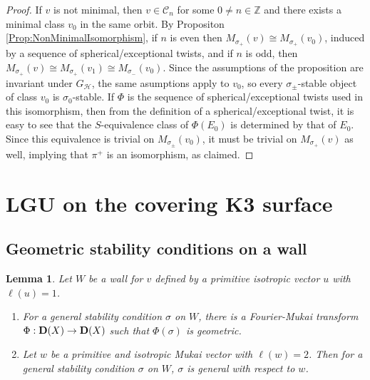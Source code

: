 \documentclass[leqno,11pt]{amsart}
\def\Z{\ensuremath{\mathbb{Z}}}
\newtheorem{Lem}[Thm]{Lemma}
\theoremstyle{definition}
\def\Z{\ensuremath{\mathbb{Z}}}
\def\CC{\ensuremath{\mathcal C}}
\def\HH{\ensuremath{\mathcal H}}
\begin{document}
\begin{proof}
If $v$ is not minimal, then $v\in\CC_n$ for some $0\neq n\in\Z$ and there exists a minimal class $v_0$ in the same orbit.  By Propositon \ref{Prop:NonMinimalIsomorphism}, if $n$ is even then $M_{\sigma_+}(v)\cong M_{\sigma_+}(v_0)$, induced by a sequence of spherical/exceptional twists, and if $n$ is odd, then $M_{\sigma_+}(v)\cong M_{\sigma_+}(v_1)\cong M_{\sigma_-}(v_0)$.  Since the assumptions of the proposition are invariant under $G_{\HH}$, the same asumptions apply to $v_0$, so every $\sigma_\pm$-stable object of class $v_0$ is $\sigma_0$-stable.  If $\Phi$ is the sequence of spherical/exceptional twists used in this isomorphism, then from the definition of a spherical/exceptional twist, it is easy to see that the $S$-equivalence class of $\Phi(E_0)$ is determined by that of $E_0$.  Since this equivalence is trivial on $M_{\sigma_{\pm}}(v_0)$, it must be trivial on $M_{\sigma_+}(v)$ as well, implying that $\pi^+$ is an isomorphism, as claimed. 
\end{proof}

\section{LGU on the covering K3 surface}

\subsection{Geometric stability conditions on a wall}


\begin{Lem}\label{lem:W-general}
Let $W$ be a wall for $v$ defined by a primitive isotropic vector $u$ with
$\ell(u)=1$.
\begin{enumerate}
\item[(1)]
For a general stability condition $\sigma$ on $W$,
there is a Fourier-Mukai transform $\Phi:{\bf D}(X) \to {\bf D}(X)$
such that $\Phi(\sigma)$ is geometric.
\item[(2)]
Let $w$ be a primitive and isotropic Mukai vector with
$\ell(w)=2$.
Then 
for a general stability condition $\sigma$ on $W$, 
$\sigma$ is general with respect to $w$.
\end{enumerate}
\end{Lem}
\end{document}
